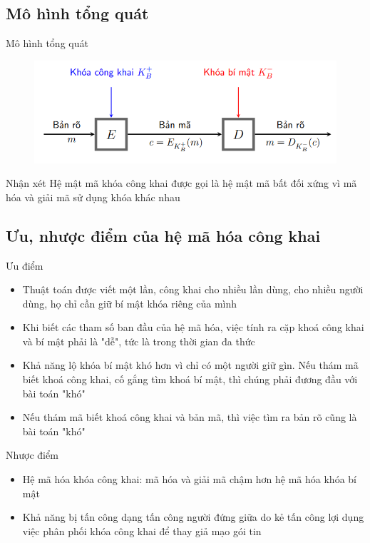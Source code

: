 \documentclass{beamer}
\numberwithin{equation}{section}
\begin{document}
\subsection{Mô hình tổng quát}
\begin{frame}{Mô hình tổng quát}
\begin{figure}[H]
\centering
\includegraphics[scale = 0.6]{pictures/mo_hinh_tong_quat.png}
\end{figure}

\begin{block}{Nhận xét}
Hệ mật mã khóa công khai được gọi là hệ mật mã bất đối xứng vì mã hóa và giải mã sử dụng khóa khác nhau
\end{block}
\end{frame}
\subsection{Ưu, nhược điểm của hệ mã hóa công khai}
\begin{frame}{Ưu điểm}
\begin{itemize}
\item Thuật toán được viết một lần, công khai cho nhiều lần dùng, cho nhiều người dùng, họ chỉ cần giữ bí mật khóa riêng của mình
\item Khi biết các tham số ban đầu của hệ mã hóa, việc tính ra cặp khoá công khai và bí mật phải là "dễ", tức là trong thời gian đa thức
\item Khả năng lộ khóa bí mật khó hơn vì chỉ có một người giữ gìn. Nếu thám mã biết khoá công khai, cố gắng tìm khoá bí mật, thì chúng phải đương đầu với bài toán "khó"
\item Nếu thám mã biết khoá công khai và bản mã, thì việc tìm ra bản rõ cũng là bài toán "khó"
\end{itemize}
\end{frame}
\begin{frame}{Nhược điểm}
\begin{itemize}
\item Hệ mã hóa khóa công khai: mã hóa và giải mã chậm hơn hệ mã hóa khóa bí mật
\item Khả năng bị tấn công dạng tấn công người đứng giữa do kẻ tấn công lợi dụng việc phân phối khóa công khai để thay giả mạo gói tin
\end{itemize}
\end{frame}
\end{document}
